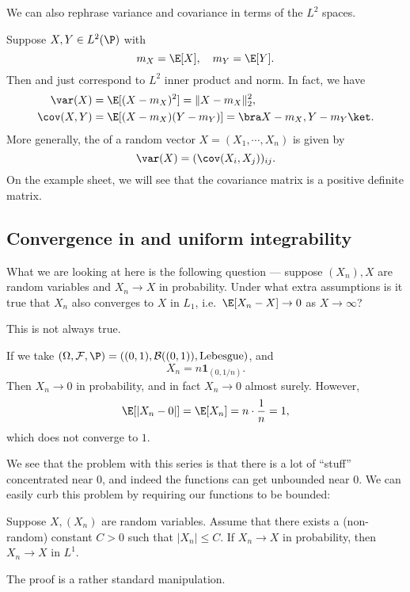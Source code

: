 \documentclass[a4paper]{article}
\begin{document}
We can also rephrase variance and covariance in terms of the $L^2$ spaces.

Suppose $X, Y \in L^2(\P)$ with
\[
  m_X = \E[X],\quad m_Y = \E[Y].
\]
Then  and  just correspond to $L^2$ inner product and norm. In fact, we have
\begin{align*}
  \var(X) &= \E[(X - m_X)^2] = \|X - m_X\|_2^2,\\
  \cov(X, Y) &= \E[(X - m_X)(Y - m_Y)] = \bra X - m_X, Y - m_Y\ket.
\end{align*}
More generally, the  of a random vector $X = (X_1, \cdots, X_n)$ is given by
\[
  \var(X) =(\cov(X_i, X_j))_{ij}.
\]
On the example sheet, we will see that the covariance matrix is a positive definite matrix.

\subsection{Convergence in  and uniform integrability}
What we are looking at here is the following question --- suppose $(X_n), X$ are random variables and $X_n \to X$ in probability. Under what extra assumptions is it true that $X_n$ also converges to $X$ in $L_1$, i.e.\ $\E[X_n - X] \to 0$ as $X \to \infty$?

This is not always true.

\begin{eg}
  If we take $(\Omega, \mathcal{F}, \P) = ((0, 1), \mathcal{B}((0, 1)), \text{Lebesgue})$, and
  \[
    X_n = n\mathbf{1}_{(0, 1/n)}.
  \]
  Then $X_n \to 0$ in probability, and in fact $X_n \to 0$ almost surely. However,
  \[
    \E[|X_n - 0|] = \E[X_n] = n \cdot \frac{1}{n} = 1,
  \]
  which does not converge to $1$.
\end{eg}

We see that the problem with this series is that there is a lot of ``stuff'' concentrated near $0$, and indeed the functions can get unbounded near $0$. We can easily curb this problem by requiring our functions to be bounded:
\begin{thm}
  Suppose $X, (X_n)$ are random variables. Assume that there exists a (non-random) constant $C > 0$ such that $|X_n| \leq C$. If $X_n \to X$ in probability, then $X_n \to X$ in $L^1$.
\end{thm}
The proof is a rather standard manipulation.
\end{document}
